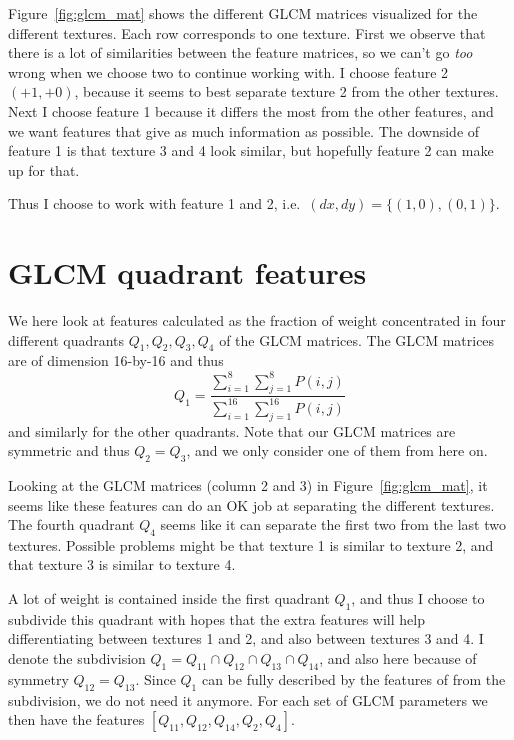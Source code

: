 \documentclass[a4paper]{article}
\begin{document}
Figure~\ref{fig:glcm_mat} shows the different GLCM matrices visualized
for the different textures. Each row corresponds to one texture. First
we observe that there is a lot of similarities between the feature
matrices, so we can't go \emph{too} wrong when we choose two to continue
working with. I choose feature 2 $(+1, +0)$, because it seems to best
separate texture 2 from the other textures. Next I choose feature 1
because it differs the most from the other features, and we want
features that give as much information as possible. The downside of
feature 1 is that texture 3 and 4 look similar, but hopefully feature 2
can make up for that.

Thus I choose to work with feature 1 and 2, i.e.\ $(dx, dy) = \{(1, 0),
(0, 1)\}$.

\section{GLCM quadrant features}

We here look at features calculated as the fraction of weight
concentrated in four different quadrants $Q_1, Q_2, Q_3, Q_4$ of the
GLCM matrices. The GLCM matrices are of dimension 16-by-16 and thus
\begin{equation}
    Q_1 = \frac{\sum_{i=1}^8 \sum_{j=1}^8 P(i, j)}{\sum_{i=1}^{16}
    \sum_{j=1}^{16} P(i, j)}
\end{equation}
and similarly for the other quadrants. Note that our GLCM matrices are
symmetric and thus $Q_2 = Q_3$, and we only consider one of them from
here on.

Looking at the GLCM matrices (column 2 and 3) in
Figure~\ref{fig:glcm_mat}, it seems like these features can do an OK job
at separating the different textures. The fourth quadrant $Q_4$ seems
like it can separate the first two from the last two textures. Possible
problems might be that texture 1 is similar to texture 2, and that
texture 3 is similar to texture 4.

A lot of weight is contained inside the first quadrant $Q_1$, and thus
I choose to subdivide this quadrant with hopes that the extra features
will help differentiating between textures 1 and 2, and also between
textures 3 and 4. I denote the subdivision $Q_1 = Q_{11} \cap Q_{12}
\cap Q_{13} \cap Q_{14}$, and also here because of symmetry $Q_{12} =
Q_{13}$. Since $Q_{1}$ can be fully described by the features of from
the subdivision, we do not need it anymore. For each set of GLCM
parameters we then have the features $[Q_{11}, Q_{12}, Q_{14}, Q_{2},
Q_{4}]$.
\end{document}
